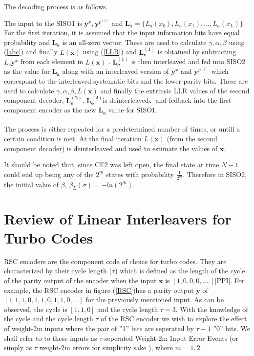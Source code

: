 \documentclass[twocolumn]{article}
\begin{document}
    
  The decoding process is as follows.
  

The input to the SISO1 is $\mathbf{y}^x,\mathbf{y}^{p^{(1)}}$ 
and $\mathbf{L}_a=\{L_a(x_0),L_a(x_1),...,L_a(x_{L})\}$. 
For the first iteration, it is assumed 
that the input information bits have equal probability and $\mathbf{L_a}$ is an 
all-zero vector.
These are used to calculate $\gamma ,\alpha , \beta$ using (\ref{abc})
 and finally
$ L(\mathbf{x})$ using (\ref{LLR}) and $\mathbf{L_e^{(1)}}$ is obtained by subtracting
 $L_c\mathbf{y}^x$  from each element in $ L(\mathbf{x})$ .
$\mathbf{L_e^{(1)}}$ is then
 interleaved and fed into SISO2 as the value for
 $\mathbf{L_a}$ along with an interleaved version of $\mathbf{y}^{x}$ and 
 $ \mathbf{y}^{p^{(2)}}$ which correspond to
 the interleaved systematic bits and the lower parity bits. These are used to calculate 
 $\gamma,\alpha , 
\beta, L(\mathbf{x})$
 and finally the extrinsic LLR values 
of the second component decoder, $\mathbf{L_e^{(2)}}$.
$\mathbf{L_e^{(2)}}$is deinterleaved、and fedback into the first component encoder
 as the new $\mathbf{L_a}$ value for SISO1.
\paragraph{}
The process is either repeated for a predetermined number of times, or untill a certain 
condition is met. At the final iteration $ L(\mathbf{x})$ (from the second component
 decoder) is deinterleaved and used to estimate the values of $\mathbf{x}$.
 
  It should be noted that, since CE2 was left open, 
 the final state at time $N-1$ could end up being any of the $2^m$ states with 
 probability $\frac{1}{2^m}$. Therefore in SISO2, the initial
 value of $\beta$, $\beta_L(\sigma)=-ln(2^m)$.

\section{Review of Linear Interleavers for Turbo Codes}
 RSC encoders are the component code of choice for turbo codes. They are
characterized by their cycle length ($\tau$) which is defined as the length of the cycle
 of the parity output of the encoder when the input $\mathbf{x}$ is $[1,0,0,0,....]$[PPI]. 
For example, the RSC encoder in figure (\ref{RSC})has a parity output $\mathbf{y}$ of 
$[1,1,1,0,1,1,0,1,1,0,...]$
for the previously mentioned input. As can be observed, the cycle is $[1,1,0]$ and
the cycle length $\tau=3$. With the knowledge of the cycle and the cycle length $\tau$
of the RSC encoder we wish to explore the effect of weight-2m inputs where the pair of
''1'' bits
 are seperated by $\tau-1$ ''0'' bits. We shall refer to to these inputs as
 $\tau$-seperated Weight-2m Input Error Events (or simply as $\tau$ weight-2m errors for
 simplicity sake ), where $m={1,2}$. 
\end{document}
